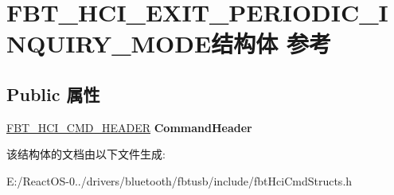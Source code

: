 \hypertarget{struct_f_b_t___h_c_i___e_x_i_t___p_e_r_i_o_d_i_c___i_n_q_u_i_r_y___m_o_d_e}{}\section{F\+B\+T\+\_\+\+H\+C\+I\+\_\+\+E\+X\+I\+T\+\_\+\+P\+E\+R\+I\+O\+D\+I\+C\+\_\+\+I\+N\+Q\+U\+I\+R\+Y\+\_\+\+M\+O\+D\+E结构体 参考}
\label{struct_f_b_t___h_c_i___e_x_i_t___p_e_r_i_o_d_i_c___i_n_q_u_i_r_y___m_o_d_e}
\subsection*{Public 属性}
\begin{DoxyCompactItemize}
\item 
\mbox{\label{struct_f_b_t___h_c_i___e_x_i_t___p_e_r_i_o_d_i_c___i_n_q_u_i_r_y___m_o_d_e_a5cf3e5cedddb28766c9c98954c24f8a0}} 
\hyperlink{struct_f_b_t___h_c_i___c_m_d___h_e_a_d_e_r}{F\+B\+T\+\_\+\+H\+C\+I\+\_\+\+C\+M\+D\+\_\+\+H\+E\+A\+D\+ER} {\bfseries Command\+Header}
\end{DoxyCompactItemize}


该结构体的文档由以下文件生成\+:\begin{DoxyCompactItemize}
\item 
E\+:/\+React\+O\+S-\/0../drivers/bluetooth/fbtusb/include/fbt\+Hci\+Cmd\+Structs.\+h\end{DoxyCompactItemize}
